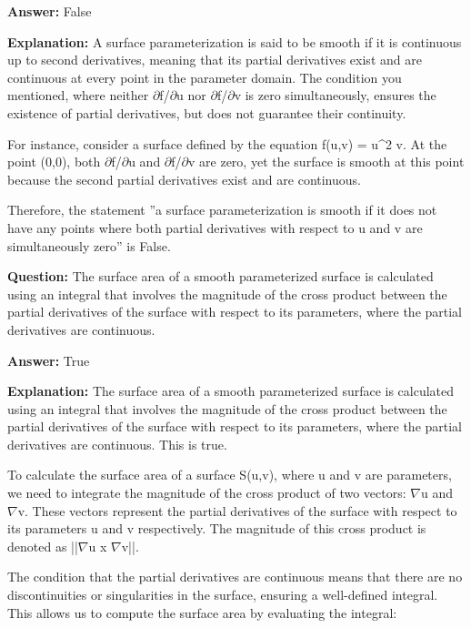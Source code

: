 \documentclass{article}
\begin{document}
                \textbf{Answer:} False

                \textbf{Explanation:} A surface parameterization is said to be smooth if it is continuous up to second derivatives, meaning that its partial derivatives exist and are continuous at every point in the parameter domain. The condition you mentioned, where neither \ensuremath{\partial}f/\ensuremath{\partial}u nor \ensuremath{\partial}f/\ensuremath{\partial}v is zero simultaneously, ensures the existence of partial derivatives, but does not guarantee their continuity.

For instance, consider a surface defined by the equation f(u,v) = u{\textasciicircum}2 v. At the point (0,0), both \ensuremath{\partial}f/\ensuremath{\partial}u and \ensuremath{\partial}f/\ensuremath{\partial}v are zero, yet the surface is smooth at this point because the second partial derivatives exist and are continuous.

Therefore, the statement ''a surface parameterization is smooth if it does not have any points where both partial derivatives with respect to u and v are simultaneously zero'' is False.
                
                \vspace{0.5cm} 
        
            
                \textbf {Question:} The surface area of a smooth parameterized surface is calculated using an integral that involves the magnitude of the cross product between the partial derivatives of the surface with respect to its parameters, where the partial derivatives are continuous.
                
                \textbf{Answer:} True

                \textbf{Explanation:} The surface area of a smooth parameterized surface is calculated using an integral that involves the magnitude of the cross product between the partial derivatives of the surface with respect to its parameters, where the partial derivatives are continuous. This is true.

To calculate the surface area of a surface S(u,v), where u and v are parameters, we need to integrate the magnitude of the cross product of two vectors: \ensuremath{\nabla}u and \ensuremath{\nabla}v. These vectors represent the partial derivatives of the surface with respect to its parameters u and v respectively. The magnitude of this cross product is denoted as ||\ensuremath{\nabla}u x \ensuremath{\nabla}v||.

The condition that the partial derivatives are continuous means that there are no discontinuities or singularities in the surface, ensuring a well-defined integral. This allows us to compute the surface area by evaluating the integral:
\end{document}
